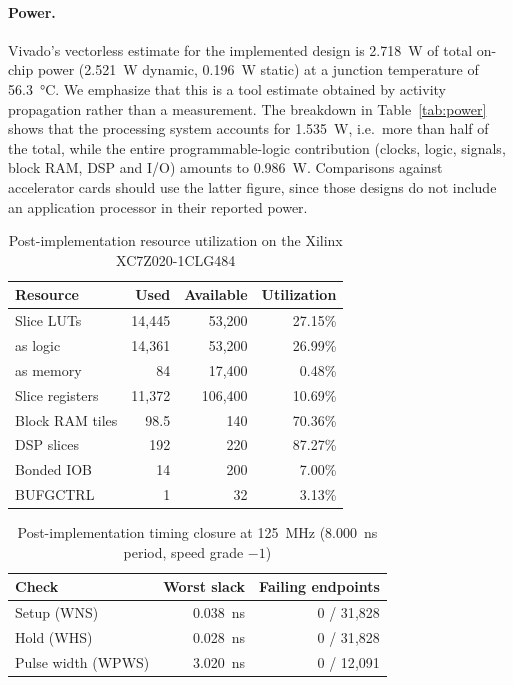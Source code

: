 \documentclass[final,5p,times,twocolumn]{elsarticle}
\begin{document}
\paragraph{Power.}
Vivado's vectorless estimate for the implemented design is \SI{2.718}{\watt} of
total on-chip power (\SI{2.521}{\watt} dynamic, \SI{0.196}{\watt} static) at a
junction temperature of \SI{56.3}{\celsius}. We emphasize that this is a tool
estimate obtained by activity propagation rather than a measurement. The
breakdown in Table~\ref{tab:power} shows that the processing system accounts for
\SI{1.535}{\watt}, i.e.\ more than half of the total, while the entire
programmable-logic contribution (clocks, logic, signals, block RAM, DSP and
I/O) amounts to \SI{0.986}{\watt}. Comparisons against accelerator cards
should use the latter figure, since those designs do not include an application
processor in their reported power.

\begin{table}[htbp]
\centering
\caption{Post-implementation resource utilization on the Xilinx XC7Z020-1CLG484}
\label{tab:resource_utilization}
\begin{tabular}{lrrr}
\toprule
Resource & Used & Available & Utilization \\
\midrule
Slice LUTs        & 14{,}445 & 53{,}200  & 27.15\% \\
\quad as logic    & 14{,}361 & 53{,}200  & 26.99\% \\
\quad as memory   &       84 & 17{,}400  &  0.48\% \\
Slice registers   & 11{,}372 & 106{,}400 & 10.69\% \\
Block RAM tiles   &     98.5 & 140       & 70.36\% \\
DSP slices        &      192 & 220       & 87.27\% \\
Bonded IOB        &       14 & 200       &  7.00\% \\
BUFGCTRL          &        1 & 32        &  3.13\% \\
\bottomrule
\end{tabular}
\end{table}

\begin{table}[htbp]
\centering
\caption{Post-implementation timing closure at \SI{125}{\mega\hertz}
(\SI{8.000}{\nano\second} period, speed grade $-1$)}
\label{tab:timing}
\begin{tabular}{lrr}
\toprule
Check & Worst slack & Failing endpoints \\
\midrule
Setup (WNS)       & \SI{0.038}{\nano\second} & 0 / 31{,}828 \\
Hold (WHS)        & \SI{0.028}{\nano\second} & 0 / 31{,}828 \\
Pulse width (WPWS)& \SI{3.020}{\nano\second} & 0 / 12{,}091 \\
\bottomrule
\end{tabular}
\end{table}
\end{document}
